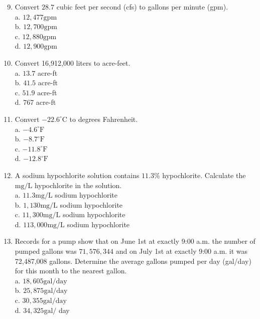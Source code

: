 \documentclass[10pt]{article}
\begin{document}
\begin{enumerate}
  \setcounter{enumi}{8}
  \item Convert $28.7$ cubic feet per second (cfs) to gallons per minute (gpm).\\
a. $12,477 \mathrm{gpm}$\\
b. $12,700 \mathrm{gpm}$\\
c. $12,880 \mathrm{gpm}$\\
d. $12,900 \mathrm{gpm}$

  \item Convert 16,912,000 liters to acre-feet.\\
a. $13.7$ acre-ft\\
b. $41.5$ acre-ft\\
c. $51.9$ acre-ft\\
d. 767 acre-ft

  \item Convert $-22.6^{\circ} \mathrm{C}$ to degrees Fahrenheit.\\
a. $-4.6^{\circ} \mathrm{F}$\\
b. $-8.7^{\circ} \mathrm{F}$\\
c. $-11.8^{\circ} \mathrm{F}$\\
d. $-12.8^{\circ} \mathrm{F}$

  \item A sodium hypochlorite solution contains $11.3 \%$ hypochlorite. Calculate the $\mathrm{mg} / \mathrm{L}$ hypochlorite in the solution.\\
a. $11.3 \mathrm{mg} / \mathrm{L}$ sodium hypochlorite\\
b. $1,130 \mathrm{mg} / \mathrm{L}$ sodium hypochlorite\\
c. $11,300 \mathrm{mg} / \mathrm{L}$ sodium hypochlorite\\
d. $113,000 \mathrm{mg} / \mathrm{L}$ sodium hypochlorite

  \item Records for a pump show that on June 1st at exactly 9:00 a.m. the number of pumped gallons was $71,576,344$ and on July 1st at exactly 9:00 a.m. it was 72,487,008 gallons. Determine the average gallons pumped per day (gal/day) for this month to the nearest gallon.\\
a. $18,605 \mathrm{gal} / \mathrm{day}$\\
b. $25,875 \mathrm{gal} / \mathrm{day}$\\
c. $30,355 \mathrm{gal} / \mathrm{day}$\\
d. $34,325 \mathrm{gal} /$ day 


\end{enumerate}
\end{document}
